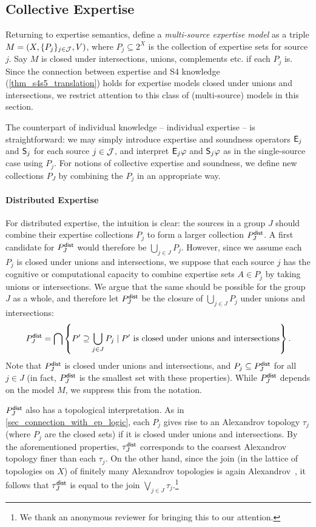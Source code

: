 \subsection{Collective Expertise}

Returning to expertise semantics, define a \emph{multi-source expertise model}
as a triple $M = (X, \{P_j\}_{j \in \J}, V)$, where $P_j \subseteq 2^X$ is the
collection of expertise sets for source $j$. Say $M$ is closed under
intersections, unions, complements etc. if each $P_j$ is. Since the connection
between expertise and S4 knowledge (\cref{thm_s4s5_translation}) holds for
expertise models closed under unions and intersections, we restrict
attention to this class of (multi-source) models in this section.

The counterpart of individual knowledge -- individual expertise -- is
straightforward: we may simply introduce expertise and soundness operators
$\E_j$ and $\S_j$ for each source $j \in \J$, and interpret
$\E_j\phi$ and $\S_j\phi$ as in the single-source case using
$P_j$. For notions of collective expertise and soundness, we define new
collections $P_J$ by combining the $P_j$ in an appropriate way.

\paragraph{Distributed Expertise}

For distributed expertise, the intuition is clear: the sources in a group
$J$ should combine their expertise collections $P_j$ to form a
larger collection $\Pdist_J$. A first candidate for $\Pdist_J$
would therefore be $\bigcup_{j \in J}{P_j}$. However, since we assume
each $P_j$ is closed under unions and intersections, we suppose that each
source $j$ has the cognitive or computational capacity to combine expertise
sets $A \in P_j$ by taking unions or intersections. We argue that the
same should be possible for the group $J$ as a whole, and therefore let
$\Pdist_J$ be the closure of $\bigcup_{j \in J}{P_j}$ under unions
and intersections:
\[
\Pdist_J
= \bigcap\left\{
 P' \supseteq \bigcup_{j \in J}{P_j}
 \mid
 P' \text{ is closed under unions and intersections}
\right\}.\]
Note that $\Pdist_J$ is closed under unions and intersections, and
$P_j \subseteq \Pdist_J$ for all $j \in J$ (in fact,
$\Pdist_J$ is the smallest set with these properties). While
$\Pdist_J$ depends on the model $M$, we suppress this from the
notation.

$\Pdist_J$ also has a topological interpretation. As in
\cref{sec_connection_with_ep_logic}, each $P_j$ gives rise to an Alexandrov
topology $\tau_j$ (where $P_j$ are the closed sets) if it is closed under
unions and intersections. By the aforementioned properties, $\tau^\dist_J$
corresponds to the coarsest Alexandrov topology finer than each $\tau_j$. On
the other hand, since the join (in the lattice of topologies on $X$) of
finitely many Alexandrov topologies is again Alexandrov~\cite[Theorems 2.4,
2.5]{steiner1966lattice}, it follows that $\tau^\dist_J$ is equal to the join
$\bigvee_{j \in J}{\tau_j}$.\footnote{
    We thank an anonymous reviewer for bringing this to our attention.
}

